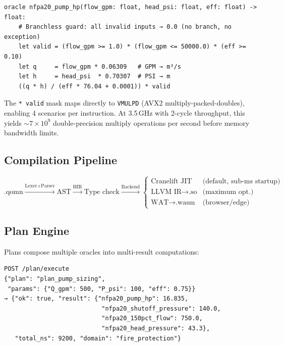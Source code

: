 \documentclass[11pt]{article}
\begin{document}
\begin{lstlisting}[caption={NFPA 20 fire pump oracle in QOMN}]
oracle nfpa20_pump_hp(flow_gpm: float, head_psi: float, eff: float) -> float:
    # Branchless guard: all invalid inputs → 0.0 (no branch, no exception)
    let valid = (flow_gpm >= 1.0) * (flow_gpm <= 50000.0) * (eff >= 0.10)
    let q     = flow_gpm * 0.06309   # GPM → m³/s
    let h     = head_psi  * 0.70307  # PSI → m
    ((q * h) / (eff * 76.04 + 0.0001)) * valid
\end{lstlisting}

The \texttt{* valid} mask maps directly to \texttt{VMULPD} (AVX2 multiply-packed-doubles),
enabling 4 scenarios per instruction. At 3.5\,GHz with 2-cycle throughput,
this yields $\sim\!7\times10^9$ double-precision multiply operations per second
before memory bandwidth limits.

\subsection{Compilation Pipeline}

\begin{equation}
\text{.qomn} \xrightarrow{\text{Lexer+Parser}} \text{AST}
             \xrightarrow{\text{HIR}} \text{Type check}
             \xrightarrow{\text{Backend}} \begin{cases}
               \text{Cranelift JIT} & \text{(default, sub-ms startup)} \\
               \text{LLVM IR} \to \text{.so} & \text{(maximum opt.)} \\
               \text{WAT} \to \text{.wasm}   & \text{(browser/edge)}
             \end{cases}
\end{equation}

\subsection{Plan Engine}

Plans compose multiple oracles into multi-result computations:

\begin{lstlisting}[caption={REST plan execution}]
POST /plan/execute
{"plan": "plan_pump_sizing",
 "params": {"Q_gpm": 500, "P_psi": 100, "eff": 0.75}}
→ {"ok": true, "result": {"nfpa20_pump_hp": 16.835,
                           "nfpa20_shutoff_pressure": 140.0,
                           "nfpa20_150pct_flow": 750.0,
                           "nfpa20_head_pressure": 43.3},
   "total_ns": 9200, "domain": "fire_protection"}
\end{lstlisting}
\end{document}

